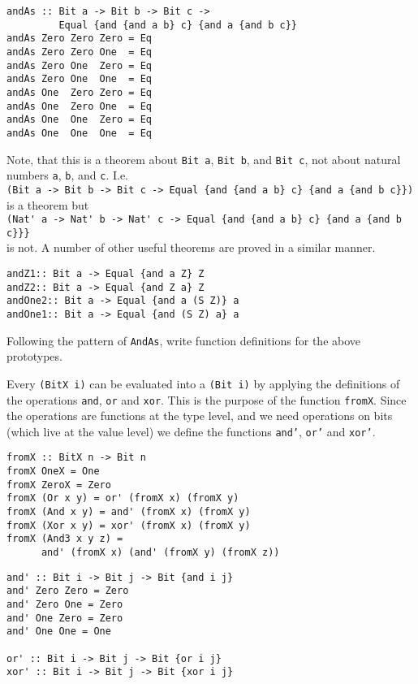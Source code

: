 \documentclass[11pt,twoside,A4]{llncs}
\begin{document}
{\small
\begin{verbatim}
andAs :: Bit a -> Bit b -> Bit c -> 
         Equal {and {and a b} c} {and a {and b c}}
andAs Zero Zero Zero = Eq
andAs Zero Zero One  = Eq
andAs Zero One  Zero = Eq
andAs Zero One  One  = Eq
andAs One  Zero Zero = Eq
andAs One  Zero One  = Eq
andAs One  One  Zero = Eq
andAs One  One  One  = Eq
\end{verbatim}}
Note, that this is a theorem about \verb+Bit a+, \verb+Bit b+, and \verb+Bit c+,
not about natural numbers {\tt a}, {\tt b}, and {\tt c}. I.e.\\
{\small \verb+(Bit a -> Bit b -> Bit c -> Equal {and {and a b} c} {and a {and b c}})+}\\
is a theorem but\\
{\small \verb+(Nat' a -> Nat' b -> Nat' c -> Equal {and {and a b} c} {and a {and b c}}}+}\\
is not.   A number of other useful theorems are proved in a similar manner.

{\small
\begin{verbatim}
andZ1:: Bit a -> Equal {and a Z} Z
andZ2:: Bit a -> Equal {and Z a} Z
andOne2:: Bit a -> Equal {and a (S Z)} a
andOne1:: Bit a -> Equal {and (S Z) a} a
\end{verbatim}}

\begin{exercise}
Following the pattern of {\tt AndAs}, write function definitions for the
above prototypes.
\end{exercise}

Every \verb+(BitX i)+ can be evaluated into a \verb+(Bit i)+ by applying
the definitions of the operations {\tt and}, {\tt or} and {\tt xor}.
This is the purpose of the function \verb+fromX+.
Since the operations are functions at the type level, and we need 
operations on bits (which live at the value level) we define
the functions {\tt and'}, {\tt or'} and {\tt xor'}.

\vspace*{.15in}

{\small
\begin{verbatim}
fromX :: BitX n -> Bit n
fromX OneX = One
fromX ZeroX = Zero
fromX (Or x y) = or' (fromX x) (fromX y)
fromX (And x y) = and' (fromX x) (fromX y)
fromX (Xor x y) = xor' (fromX x) (fromX y)
fromX (And3 x y z) = 
      and' (fromX x) (and' (fromX y) (fromX z))

\end{verbatim}}

{\small
\begin{verbatim}
and' :: Bit i -> Bit j -> Bit {and i j}
and' Zero Zero = Zero
and' Zero One = Zero
and' One Zero = Zero
and' One One = One

or' :: Bit i -> Bit j -> Bit {or i j}
xor' :: Bit i -> Bit j -> Bit {xor i j}
\end{verbatim}}
\vspace*{.15in}
\end{document}
